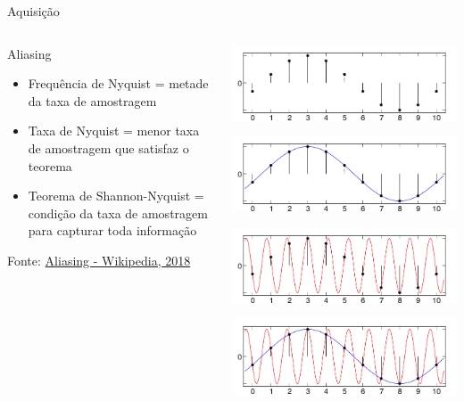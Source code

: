\documentclass[t]{beamer}
\begin{document}
\begin{frame}[t]{Aquisição}
	\begin{columns}[T]
		\begin{column}{0.5\textwidth}
			Aliasing			
			\begin{itemize}
				\item Frequência de Nyquist = metade da taxa de amostragem
				\item Taxa de Nyquist = menor taxa de amostragem que satisfaz o teorema
				\item Teorema de Shannon-Nyquist = condição da taxa de amostragem para capturar toda informação
			\end{itemize}
		{\scriptsize Fonte: \href{https://en.wikipedia.org/wiki/Aliasing}{Aliasing - Wikipedia, 2018}}
		\end{column}
		\begin{column}{0.5\textwidth}
			\includegraphics[width=\textwidth]{aliasingpontos}
			
			\includegraphics[width=\textwidth]{aliasingazul}
			
			\includegraphics[width=\textwidth]{aliasingvermelho}
			
			\includegraphics[width=\textwidth]{aliasing}
		\end{column}
	\end{columns}
\end{frame}
\end{document}
